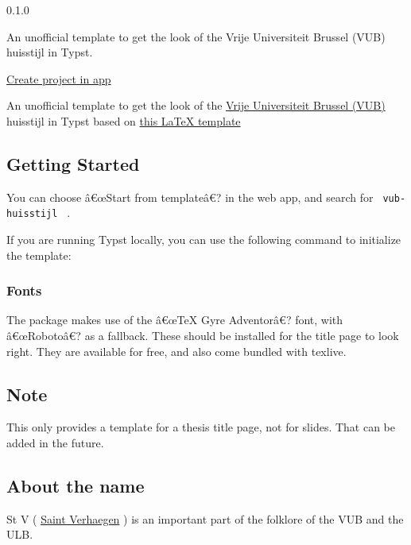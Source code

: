 { 0.1.0 }

An unofficial template to get the look of the Vrije Universiteit Brussel
(VUB) huisstijl in Typst.

\href{/app?template=stv-vub-huisstijl&version=0.1.0}{Create project in
app}

\label{readme}
An unofficial template to get the look of the
\href{https://www.vub.be/}{Vrije Universiteit Brussel (VUB)} huisstijl
in Typst based on \href{https://gitlab.com/rubdos/texlive-vub}{this
LaTeX template}

\subsection{Getting Started}\label{getting-started}

You can choose â€œStart from templateâ€? in the web app, and search for
\texttt{\ vub-huisstijl\ } .

If you are running Typst locally, you can use the following command to
initialize the template:

\begin{Shaded}
\begin{Highlighting}[]
\end{Highlighting}
\end{Shaded}

\subsubsection{Fonts}\label{fonts}

The package makes use of the â€œTeX Gyre Adventorâ€? font, with
â€œRobotoâ€? as a fallback. These should be installed for the title page
to look right. They are available for free, and also come bundled with
texlive.

\subsection{Note}\label{note}

This only provides a template for a thesis title page, not for slides.
That can be added in the future.

\subsection{About the name}\label{about-the-name}

St V ( \href{https://en.wikipedia.org/wiki/Saint_Verhaegen}{Saint
Verhaegen} ) is an important part of the folklore of the VUB and the
ULB.

